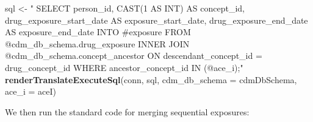 \documentclass[11pt]{book}
\newenvironment{Shaded}{\begin{snugshade}}{\end{snugshade}}
\newcommand{\KeywordTok}[1]{\textcolor[rgb]{0.13,0.29,0.53}{\textbf{#1}}}
\newcommand{\DataTypeTok}[1]{\textcolor[rgb]{0.13,0.29,0.53}{#1}}
\newcommand{\StringTok}[1]{\textcolor[rgb]{0.31,0.60,0.02}{#1}}
\newcommand{\NormalTok}[1]{#1}
\theoremstyle{definition}
\theoremstyle{definition}
\theoremstyle{definition}
\theoremstyle{remark}
\begin{document}
\begin{Shaded}
\begin{Highlighting}[]
\NormalTok{sql <-}\StringTok{ "}
\StringTok{  SELECT person_id,}
\StringTok{    CAST(1 AS INT) AS concept_id,}
\StringTok{    drug_exposure_start_date AS exposure_start_date,}
\StringTok{    drug_exposure_end_date AS exposure_end_date}
\StringTok{  INTO #exposure}
\StringTok{  FROM @cdm_db_schema.drug_exposure}
\StringTok{  INNER JOIN @cdm_db_schema.concept_ancestor}
\StringTok{    ON descendant_concept_id = drug_concept_id}
\StringTok{  WHERE ancestor_concept_id IN (@ace_i);"}
\KeywordTok{renderTranslateExecuteSql}\NormalTok{(conn,}
\NormalTok{                          sql, }
                          \DataTypeTok{cdm_db_schema =}\NormalTok{ cdmDbSchema, }
                          \DataTypeTok{ace_i =}\NormalTok{ aceI)}
\end{Highlighting}
\end{Shaded}

We then run the standard code for merging sequential exposures:
\end{document}
